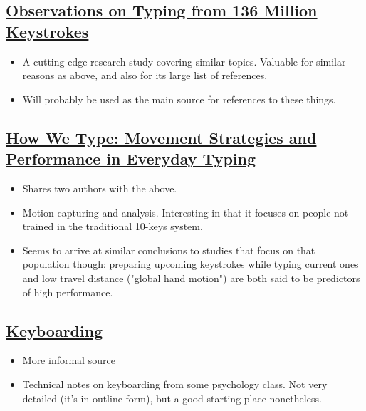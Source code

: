 \documentclass[11pt]{article}
\begin{document}
\subsection{\href{https://userinterfaces.aalto.fi/136Mkeystrokes/resources/chi-18-analysis.pdf}{Observations on Typing from 136 Million Keystrokes}}
\label{sec:orga658515}

\begin{itemize}
\item A cutting edge research study covering similar topics. Valuable for similar reasons as above, and also for its large list of references.
\item Will probably be used as the main source for references to these things.
\end{itemize}

\subsection{\href{http://delivery.acm.org/10.1145/2860000/2858233/p4262-feit.pdf?ip=71.12.145.131\&id=2858233\&acc=OA\&key=4D4702B0C3E38B35\%2E4D4702B0C3E38B35\%2E4D4702B0C3E38B35\%2EBA9FD68CFF7EBD7B\&\_\_acm\_\_=1531110151\_c810200d84c7d418a4ab994f974c2bce}{How We Type: Movement Strategies and Performance in Everyday Typing}}
\label{sec:org37d8e76}

\begin{itemize}
\item Shares two authors with the above.
\item Motion capturing and analysis. Interesting in that it focuses on people not trained in the traditional 10-keys system.
\item Seems to arrive at similar conclusions to studies that focus on that population though: preparing upcoming keystrokes while typing current ones and low travel distance ("global hand motion") are both said to be predictors of high performance.
\end{itemize}

\subsection{\href{http://www.psy.vanderbilt.edu/courses/psy216/KEYBOARD.HTM}{Keyboarding}}
\label{sec:org5d26788}

\begin{itemize}
\item More informal source
\item Technical notes on keyboarding from some psychology class. Not very detailed (it's in outline form), but a good starting place nonetheless.
\end{itemize}
\end{document}
